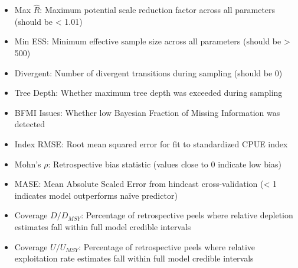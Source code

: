\documentclass[
  11pt,
]{SCreport}
\providecommand{\tightlist}{%
  \setlength{\itemsep}{0pt}\setlength{\parskip}{0pt}}\usepackage{longtable,booktabs,array}
\begin{document}
\begin{landscape}
\begin{itemize}
\tightlist
\item
  Max \(\hat{R}\): Maximum potential scale reduction factor across all
  parameters (should be \textless{} 1.01)
\item
  Min ESS: Minimum effective sample size across all parameters (should
  be \textgreater{} 500)
\item
  Divergent: Number of divergent transitions during sampling (should be
  0)
\item
  Tree Depth: Whether maximum tree depth was exceeded during sampling
\item
  BFMI Issues: Whether low Bayesian Fraction of Missing Information was
  detected
\item
  Index RMSE: Root mean squared error for fit to standardized CPUE index
\item
  Mohn's \(\rho\): Retrospective bias statistic (values close to 0
  indicate low bias)
\item
  MASE: Mean Absolute Scaled Error from hindcast cross-validation
  (\textless{} 1 indicates model outperforms naïve predictor)
\item
  Coverage \(D/D_{MSY}\): Percentage of retrospective peels where
  relative depletion estimates fall within full model credible intervals
\item
  Coverage \(U/U_{MSY}\): Percentage of retrospective peels where
  relative exploitation rate estimates fall within full model credible
  intervals
\end{itemize}

\end{landscape}

\newpage
\end{document}
